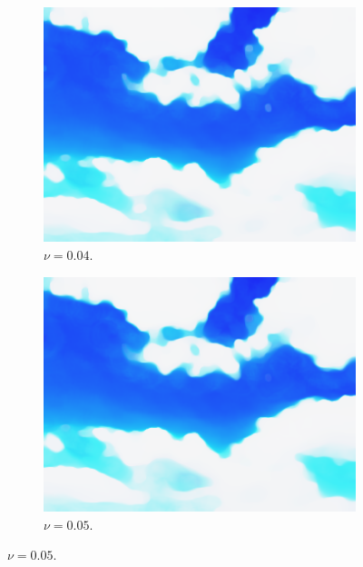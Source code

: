 \documentclass[abstracton]{scrreprt}
\begin{document}
\begin{figure}[!ht]
\begin{subfigure}[b]{0.24\textwidth}
                    \includegraphics[width=\textwidth]{img/segmentation/cr/004blue.png}
                    \caption{$\nu = 0.04$.}
                \end{subfigure}
                \begin{subfigure}[b]{0.24\textwidth}
                    \includegraphics[width=\textwidth]{img/segmentation/cr/005blue.png}
                    \caption{$\nu = 0.05$.}
                \end{subfigure}

\end{figure}
\end{document}
